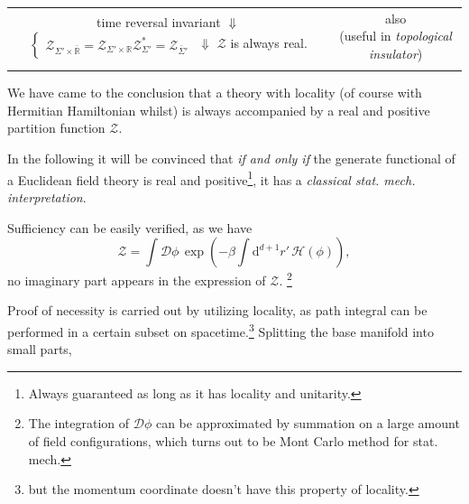 \begin{center}
\begin{tabular}{|c|c|}
        \parbox{6cm}{\centering
            time reversal invariant \\
            $\Downarrow$ \\
            $\begin{cases} 
                \mathcal{Z}_{\Sigma' \times \bar{\mathbb{R}}} = \mathcal{Z}_{\Sigma' \times \mathbb{R}} \\
                \mathcal{Z}_{\Sigma'}^{*} = \mathcal{Z}_{\bar{\Sigma}'}
              \end{cases}
            $\\
            $\Downarrow$ \\
            $\mathcal{Z}$ is always real.
            }&
        \parbox{6cm}{
            \centering also \\ (useful in \emph{topological insulator})
            }
            \\ & \\
            \hline
        
    \end{tabular}
\end{center}
\clearpage
We have came to the conclusion that a theory with locality (of course with Hermitian Hamiltonian whilst) is always accompanied by a real and positive partition function $\mathcal{Z}$.



In the following it will be convinced that \emph{if and only if} the generate functional of a Euclidean field theory is real and positive\footnote{
    Always guaranteed as long as it has locality and unitarity.
}, it has a \emph{classical stat. mech. interpretation}.

Sufficiency can be easily verified, as we have
\begin{equation}
  \mathcal{Z} = \int \mathcal{D} \phi  \, \exp\left( - \beta \int \mathrm{d} ^{d+1} r' \, \mathcal{H}(\phi) \right),
\end{equation}
no imaginary part appears in the expression of $\mathcal{Z}$.
\footnote{The integration of $\mathcal{D} \phi $ can be approximated by summation on a large amount of field configurations, which turns out to be Mont Carlo method for stat. mech.}

Proof of necessity is carried out by utilizing locality, as path integral can be performed in a certain subset on spacetime.\footnote{but the momentum coordinate doesn't have this property of locality.}
Splitting the base manifold into small parts, 






